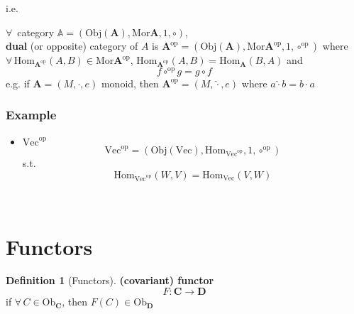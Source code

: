 \documentclass[twoside,landscape,10pt]{amsart}
\theoremstyle{plain}
\theoremstyle{definition}
\newtheorem{definition}{Definition}
\theoremstyle{remark}
\begin{document}
\begin{multicols*}{2}
i.e. 

$\forall \, $ category $\mathbb{A} = (\text{Obj}(\mathbf{A}), \text{Mor}\mathbf{A}, 1, \circ)$, \\
\textbf{dual} (or opposite) category of $A$ is $\mathbf{A}^{\text{op}} = (\text{Obj}(\mathbf{A}), \text{Mor}\mathbf{A}^{\text{op}}, 1, \circ^{\text{op}})$ where $\forall \, \text{Hom}_{\mathbf{A}^{\text{op}}}(A,B) \in \text{Mor}\mathbf{A}^{\text{op}}$, $\text{Hom}_{\mathbf{A}^{\text{op}}}(A,B) = \text{Hom}_{\mathbf{A}}(B,A)$ and 
\[
f\circ^{\text{op}}g = g\circ f
\]
e.g. if $\mathbf{A} = (M,\cdot, e)$ monoid, then $\mathbf{A}^{\text{op}} = (M, \widehat{\cdot},e)$ where $a\widehat{\cdot} b = b\cdot a$


\subsubsection{Example}

\begin{itemize}
  \item $\text{Vec}^{\text{op}}$
\[
\text{Vec}^{\text{op}} = (\text{Obj}(\text{Vec}), \text{Hom}_{\text{Vec}^{\text{op}}}, 1, \circ^{\text{op}})
\]
s.t.
\[
\text{Hom}_{\text{Vec}^{\text{op}} }(W,V) = \text{Hom}_{\text{Vec}}(V,W)
\]


 \qquad \, 


\end{itemize}


\section{Functors}

\begin{definition}[Functors]
\textbf{(covariant) functor} 
\[
F : \mathbf{C} \to \mathbf{D}
\]
if $\forall \, C \in \text{Ob}_{\mathbf{C}}$, then $F(C) \in \text{Ob}_{\mathbf{D}}$


\end{definition}
\end{multicols*}
\end{document}
